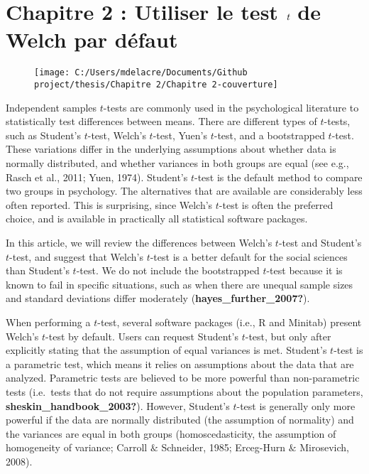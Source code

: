 \documentclass[
  english,
  man]{apa6}
\author{\phantom{0}}
\date{}
\affiliation{\phantom{0}}
\begin{document}
\hypertarget{chapitre-2-utiliser-le-test-bf-emph-t-de-welch-par-duxe9faut}{%
\section{\texorpdfstring{Chapitre 2 : Utiliser le test \(\bf \emph t\) de Welch par défaut}{Chapitre 2 : Utiliser le test \textbackslash bf \textbackslash emph t de Welch par défaut}}\label{chapitre-2-utiliser-le-test-bf-emph-t-de-welch-par-duxe9faut}}

\begin{figure}

{\centering \texttt{[image: C:/Users/mdelacre/Documents/Github project/thesis/Chapitre 2/Chapitre 2-couverture]} 

}

\caption{ }\label{fig:chp2p1}
\end{figure}

Independent samples \(t\)-tests are commonly used in the psychological literature to statistically test differences between means. There are different types of \(t\)-tests, such as Student's \(t\)-test, Welch's \(t\)-test, Yuen's \(t\)-test, and a bootstrapped \(t\)-test. These variations differ in the underlying assumptions about whether data is normally distributed, and whether variances in both groups are equal (see e.g., Rasch et al., 2011; Yuen, 1974). Student's \(t\)-test is the default method to compare two groups in psychology. The alternatives that are available are considerably less often reported. This is surprising, since Welch's \(t\)-test is often the preferred choice, and is available in practically all statistical software packages.

In this article, we will review the differences between Welch's \(t\)-test and Student's \(t\)-test, and suggest that Welch's \(t\)-test is a better default for the social sciences than Student's \(t\)-test. We do not include the bootstrapped \(t\)-test because it is known to fail in specific situations, such as when there are unequal sample sizes and standard deviations differ moderately (\textbf{hayes\_further\_2007?}).

When performing a \(t\)-test, several software packages (i.e., R and Minitab) present Welch's \(t\)-test by default. Users can request Student's \(t\)-test, but only after explicitly stating that the assumption of equal variances is met. Student's \(t\)-test is a parametric test, which means it relies on assumptions about the data that are analyzed. Parametric tests are believed to be more powerful than non-parametric tests (i.e.~tests that do not require assumptions about the population parameters, \textbf{sheskin\_handbook\_2003?}). However, Student's \(t\)-test is generally only more powerful if the data are normally distributed (the assumption of normality) and the variances are equal in both groups (homoscedasticity, the assumption of homogeneity of variance; Carroll \(\&\) Schneider,
1985; Erceg-Hurn \(\&\) Mirosevich, 2008).
\end{document}

